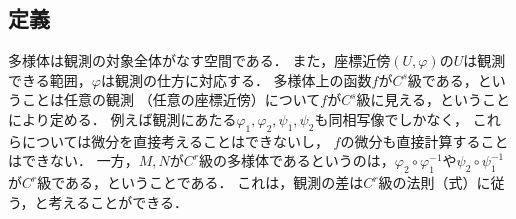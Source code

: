 \documentclass[uplatex,dvipdfmx]{jsreport}
\begin{document}
\subsection{定義}

\begin{tcolorbox}[colframe=ForestGreen, colback=ForestGreen!10!white,breakable,colbacktitle=ForestGreen!40!white,coltitle=black,fonttitle=\bfseries\sffamily,
title=局所Euclid空間のうちHausdorffなものが位相多様体で，チャート同士が$C^r$級で両立するものが微分可能多様体]
    多様体は観測の対象全体がなす空間である．
    また，座標近傍$(U,\varphi)$の$U$は観測できる範囲，$\varphi$は観測の仕方に対応する．
    多様体上の函数$f$が$C^s$級である，ということは任意の観測
    （任意の座標近傍）について$f$が$C^s$級に見える，ということにより定める．
    例えば観測にあたる$\varphi_1,\varphi_2,\psi_1,\psi_2$も同相写像でしかなく，
    これらについては微分を直接考えることはできないし，
    $f$の微分も直接計算することはできない．
    一方，$M,N$が$C^r$級の多様体であるというのは，$\varphi_2\circ\varphi_1^{-1}$や$\psi_2\circ\psi_1^{-1}$が$C^r$級である，ということである．
    これは，観測の差は$C^r$級の法則（式）に従う，と考えることができる．
\end{tcolorbox}
\end{document}
